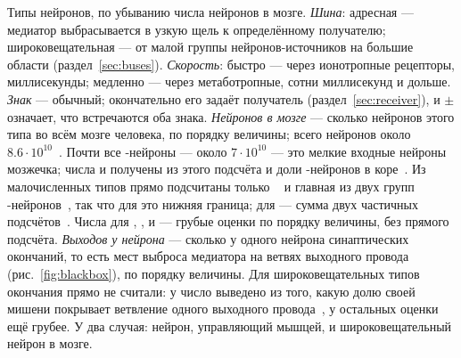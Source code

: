 \begin{table}[t]
\caption{Типы нейронов, по убыванию числа нейронов в мозге. \emph{Шина}: адресная --- медиатор выбрасывается в узкую щель к определённому получателю; широковещательная --- от малой группы нейронов-источников на большие области (раздел~\ref{sec:buses}). \emph{Скорость}: быстро --- через ионотропные рецепторы, миллисекунды; медленно --- через метаботропные, сотни миллисекунд и дольше. \emph{Знак} --- обычный; окончательно его задаёт получатель (раздел~\ref{sec:receiver}), и $\pm$ означает, что встречаются оба знака. \emph{Нейронов в мозге} --- сколько нейронов этого типа во всём мозге человека, по порядку величины; всего нейронов около $8.6\cdot10^{10}$~\cite{Azevedo2009}. Почти все -нейроны --- около $7\cdot10^{10}$ --- это мелкие входные нейроны мозжечка; числа  и  получены из этого подсчёта и доли -нейронов в коре~\cite{Hendry1987}. Из малочисленных типов прямо подсчитаны только ~\cite{Airaksinen1991} и главная из двух групп -нейронов~\cite{Pakkenberg1991}, так что для  это нижняя граница; для  --- сумма двух частичных подсчётов~\cite{Baker1990,Baker1991}. Числа для , ,  и  --- грубые оценки по порядку величины, без прямого подсчёта. \emph{Выходов у нейрона} --- сколько у одного нейрона синаптических окончаний, то есть мест выброса медиатора на ветвях выходного провода (рис.~\ref{fig:blackbox}), по порядку величины. Для широковещательных типов окончания прямо не считали: у  число выведено из того, какую долю своей мишени покрывает ветвление одного выходного провода~\cite{Matsuda2009}, у остальных оценки ещё грубее. У  два случая: нейрон, управляющий мышцей, и широковещательный нейрон в мозге.}
\label{tab:types}
\end{table}

